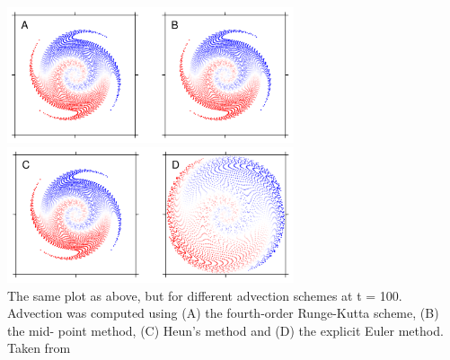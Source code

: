\begin{center}
\includegraphics[height=4cm]{images/rk/maie12b}
\includegraphics[height=4cm]{images/rk/maie12c}\\
{\captionfont The same plot as above, but for different advection schemes at t = 100.
Advection was computed using (A) the fourth-order Runge-Kutta scheme, (B) the mid-
point method, (C) Heun’s method and (D) the explicit Euler method. Taken from \cite{maie12}}
\end{center}


\bscthesis {}



